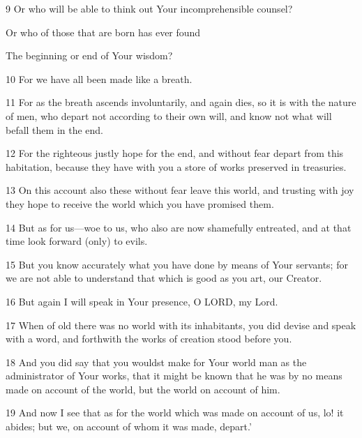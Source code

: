 \par 9 Or who will be able to think out Your incomprehensible counsel?

\par Or who of those that are born has ever found

\par The beginning or end of Your wisdom?


\par 10 For we have all been made like a breath. 

\par 11 For as the breath ascends involuntarily, and again dies, so it is with the nature of men, who depart not according to their own will, and know not what will befall them in the end. 

\par 12 For the righteous justly hope for the end, and without fear depart from this habitation, because they have with you a store of works preserved in treasuries. 

\par 13 On this account also these without fear leave this world, and trusting with joy they hope to receive the world which you have promised them. 

\par 14 But as for us—woe to us, who also are now shamefully entreated, and at that time look forward (only) to evils. 

\par 15 But you know accurately what you have done by means of Your servants; for we are not able to understand that which is good as you art, our Creator. 

\par 16 But again I will speak in Your presence, O LORD, my Lord. 

\par 17 When of old there was no world with its inhabitants, you did devise and speak with a word, and forthwith the works of creation stood before you. 

\par 18 And you did say that you wouldst make for Your world man as the administrator of Your works, that it might be known that he was by no means made on account of the world, but the world on account of him. 

\par 19 And now I see that as for the world which was made on account of us, lo! it abides; but we, on account of whom it was made, depart.’


